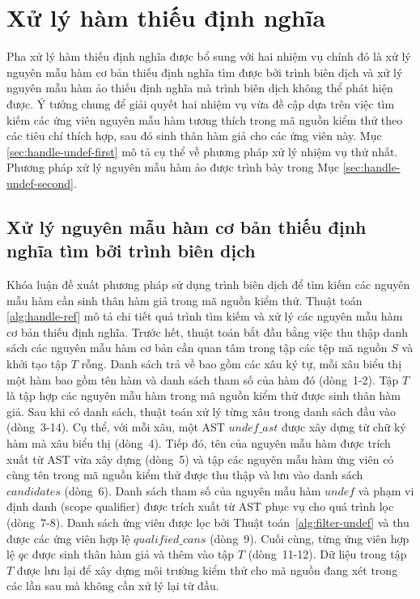 \section{Xử lý hàm thiếu định nghĩa} \label{sec:handle-undef}
Pha xử lý hàm thiếu định nghĩa được bổ sung với hai nhiệm vụ chính đó là xử lý nguyên mẫu hàm cơ bản thiếu định nghĩa tìm được bởi trình biên dịch và xử lý nguyên mẫu hàm ảo thiếu định nghĩa mà trình biên dịch không thể phát hiện được. Ý tưởng chung để giải quyết hai nhiệm vụ vừa đề cập dựa trên việc tìm kiếm các ứng viên nguyên mẫu hàm tương thích trong mã nguồn kiểm thử theo các tiêu chí thích hợp, sau đó sinh thân hàm giả cho các ứng viên này. Mục \autoref{sec:handle-undef-first} mô tả cụ thể về phương pháp xử lý nhiệm vụ thứ nhất. Phương pháp xử lý nguyên mẫu hàm ảo được trình bày trong Mục \autoref{sec:handle-undef-second}.

\subsection{Xử lý nguyên mẫu hàm cơ bản thiếu định nghĩa tìm bởi trình biên dịch} \label{sec:handle-undef-first}
Khóa luận đề xuất phương pháp sử dụng trình biên dịch để tìm kiếm các nguyên mẫu hàm cần sinh thân hàm giả trong mã nguồn kiểm thử. Thuật toán \autoref{alg:handle-ref} mô tả chi tiết quá trình tìm kiếm và xử lý các nguyên mẫu hàm cơ bản thiếu định nghĩa. Trước hết, thuật toán bắt đầu bằng việc thu thập danh sách các nguyên mẫu hàm cơ bản cần quan tâm trong tập các tệp mã nguồn $S$ và khởi tạo tập $T$ rỗng. Danh sách trả về bao gồm các xâu ký tự, mỗi xâu biểu thị một hàm bao gồm tên hàm và danh sách tham số của hàm đó (dòng~1-2). Tập $T$ là tập hợp các nguyên mẫu hàm trong mã nguồn kiểm thử được sinh thân hàm giả. Sau khi có danh sách, thuật toán xử lý từng xâu trong danh sách đầu vào (dòng~3-14). Cụ thể, với mỗi xâu, một AST $undef\_ast$ được xây dựng từ chữ ký hàm mà xâu biểu thị (dòng~4). Tiếp đó, tên của nguyên mẫu hàm được trích xuất từ AST vừa xây dựng (dòng~5) và tập các nguyên mẫu hàm ứng viên có cùng tên trong mã nguồn kiểm thử được thu thập và lưu vào danh sách $candidates$ (dòng~6). Danh sách tham số của nguyên mẫu hàm $undef$ và phạm vi định danh (scope qualifier) được trích xuất từ AST phục vụ cho quá trình lọc (dòng~7-8). Danh sách ứng viên được lọc bởi Thuật toán~\ref{alg:filter-undef} và thu được các ứng viên hợp lệ $qualified\_cans$ (dòng~9). Cuối cùng, từng ứng viên hợp lệ $qc$ được sinh thân hàm giả và thêm vào tập $T$ (dòng~11-12). Dữ liệu trong tập $T$ được lưu lại để xây dựng môi trường kiểm thử cho mã nguồn đang xét trong các lần sau mà không cần xử lý lại từ đầu.

